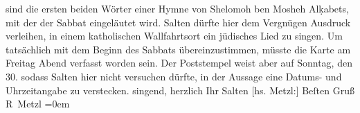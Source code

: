 \begin{ledgroupsized}[t]{13cm}
{{{                  sind die ersten beiden Wörter einer Hymne von Shelomoh ben Mosheh Alḳabets, mit der der Sabbat eingeläutet wird. Salten dürfte hier dem  
                  Vergnügen Ausdruck verleihen, in einem katholischen Wallfahrtsort ein jüdisches Lied 
                  zu singen. Um tatsächlich mit dem Beginn des Sabbats übereinzustimmen, müsste die Karte
                  am Freitag Abend verfasst worden sein. Der Poststempel
                  weist aber auf Sonntag, den 30. sodass Salten hier
                  nicht versuchen dürfte, in der Aussage eine Datums- und Uhrzeitangabe zu verstecken.}}}\label{K_L03410-2h}
                  singend,
            \pend
           \pstart herzlich Ihr \spacefill\mbox{Salten}\pend{}\pstart
           {[}hs. Metzl:{]} Beſten Gruß {\\[\baselineskip]}\spacefill\mbox{R Metzl}\pend
           \leftskip=0em{}
         
         \endnumbering{}\end{ledgroupsized}  \newcommand{\dateiname}{L03410}\newcommand{\titel}{Felix Salten und Richard Metzl an Arthur Schnitzler, [30. 7. 1905?]}\newcommand{\editorInnen}{Martin Anton Müller und Laura Untner}
      